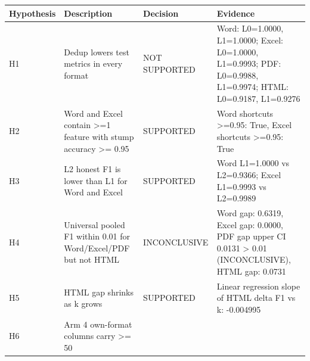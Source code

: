 \begin{tabular}{llll}
\toprule
Hypothesis & Description & Decision & Evidence \\
\midrule
H1 & Dedup lowers test metrics in every format & NOT SUPPORTED & Word: L0=1.0000, L1=1.0000; Excel: L0=1.0000, L1=0.9993; PDF: L0=0.9988, L1=0.9974; HTML: L0=0.9187, L1=0.9276 \\
H2 & Word and Excel contain >=1 feature with stump accuracy >= 0.95 & SUPPORTED & Word shortcuts >=0.95: True, Excel shortcuts >=0.95: True \\
H3 & L2 honest F1 is lower than L1 for Word and Excel & SUPPORTED & Word L1=1.0000 vs L2=0.9366; Excel L1=0.9993 vs L2=0.9989 \\
H4 & Universal pooled F1 within 0.01 for Word/Excel/PDF but not HTML & INCONCLUSIVE & Word gap: 0.6319, Excel gap: 0.0000, PDF gap upper CI 0.0131 > 0.01 (INCONCLUSIVE), HTML gap: 0.0731 \\
H5 & HTML gap shrinks as k grows & SUPPORTED & Linear regression slope of HTML delta F1 vs k: -0.004995 \\
H6 & Arm 4 own-format columns carry >= 50%
\bottomrule
\end{tabular}
